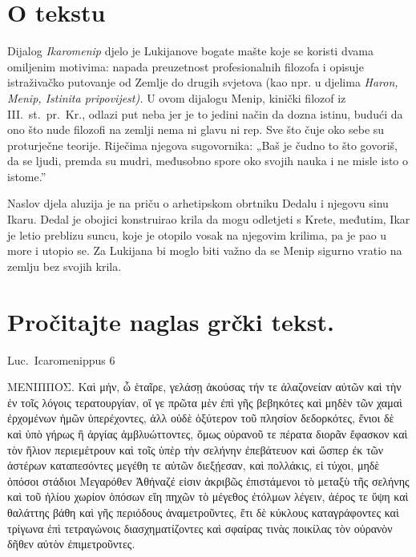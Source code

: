 


\section*{O tekstu}

Dijalog \textit{Ikaromenip} djelo je Lukijanove bogate mašte koje se koristi dvama omiljenim motivima: napada preuzetnost profesionalnih filozofa i opisuje istraživačko putovanje od Zemlje do drugih svjetova (kao npr. u djelima \textit{Haron, Menip, Istinita pripovijest).} U ovom dijalogu Menip, kinički filozof iz III.~st.\ pr.~Kr., odlazi put neba jer je to jedini način da dozna istinu, budući da ono što nude filozofi na zemlji nema ni glavu ni rep. Sve što čuje oko sebe su proturječne teorije. Riječima njegova sugovornika: „Baš je čudno to što govoriš, da se ljudi, premda su mudri, međusobno spore oko svojih nauka i ne misle isto o istome.” 

Naslov djela aluzija je na priču o arhetipskom obrtniku Dedalu i njegovu sinu Ikaru. Dedal je obojici konstruirao krila da mogu odletjeti s Krete, međutim, Ikar je letio preblizu suncu, koje je otopilo vosak na njegovim krilima, pa je pao u more i utopio se. Za Lukijana bi moglo biti važno da se Menip sigurno vratio na zemlju bez svojih krila.



\section*{Pročitajte naglas grčki tekst.}

Luc.\ Icaromenippus 6


\medskip


{\large

\begin{greek}

\noindent ΜΕΝΙΠΠΟΣ. Καὶ μήν, ὦ ἑταῖρε, γελάσῃ ἀκούσας τήν τε ἀλαζονείαν αὐτῶν καὶ τὴν ἐν τοῖς λόγοις τερατουργίαν, οἵ γε πρῶτα μὲν ἐπὶ γῆς βεβηκότες καὶ μηδὲν τῶν χαμαὶ ἐρχομένων ἡμῶν ὑπερέχοντες, ἀλλ οὐδὲ ὀξύτερον τοῦ πλησίον δεδορκότες, ἔνιοι δὲ καὶ ὑπὸ γήρως ἢ ἀργίας ἀμβλυώττοντες, ὅμως οὐρανοῦ τε πέρατα διορᾶν ἔφασκον καὶ τὸν ἥλιον περιεμέτρουν καὶ τοῖς ὑπὲρ τὴν σελήνην ἐπεβάτευον καὶ ὥσπερ ἐκ τῶν ἀστέρων καταπεσόντες μεγέθη τε αὐτῶν διεξῄεσαν, καὶ πολλάκις, εἰ τύχοι, μηδὲ ὁπόσοι στάδιοι Μεγαρόθεν Ἀθήναζέ εἰσιν ἀκριβῶς ἐπιστάμενοι τὸ μεταξὺ τῆς σελήνης καὶ τοῦ ἡλίου χωρίον ὁπόσων εἴη πηχῶν τὸ μέγεθος ἐτόλμων λέγειν, ἀέρος τε ὕψη καὶ θαλάττης βάθη καὶ γῆς περιόδους ἀναμετροῦντες, ἔτι δὲ κύκλους καταγράφοντες καὶ τρίγωνα ἐπὶ τετραγώνοις διασχηματίζοντες καὶ σφαίρας τινὰς ποικίλας τὸν οὐρανὸν δῆθεν αὐτὸν ἐπιμετροῦντες.

\end{greek}

}


